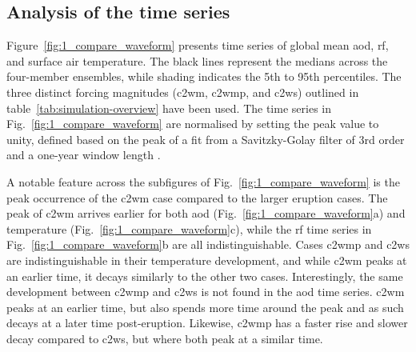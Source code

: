 \documentclass{ametsocV6.1}
\begin{document}

\subsection{Analysis of the time series}

Figure~\ref{fig:1_compare_waveform} presents time series of global mean \gls{aod},
\gls{rf}, and surface air temperature. The black lines represent the medians across the
four-member ensembles, while shading indicates the 5th to 95th percentiles. The three
distinct forcing magnitudes (\gls{c2wm}, \gls{c2wmp}, and \gls{c2ws}) outlined in
table~\ref{tab:simulation-overview} have been used. The time series in
Fig.~\ref{fig:1_compare_waveform} are normalised by setting the peak value to unity,
defined based on the peak of a fit from a Savitzky-Golay filter of 3rd order and a
one-year window length \citep{savitzky1964}.

A notable feature across the subfigures of Fig.~\ref{fig:1_compare_waveform} is the peak
occurrence of the \gls{c2wm} case compared to the larger eruption cases. The peak of
\gls{c2wm} arrives earlier for both \gls{aod} (Fig.~\ref{fig:1_compare_waveform}a) and
temperature (Fig.~\ref{fig:1_compare_waveform}c), while the \gls{rf} time series in
Fig.~\ref{fig:1_compare_waveform}b are all indistinguishable. Cases \gls{c2wmp} and
\gls{c2ws} are indistinguishable in their temperature development, and while \gls{c2wm}
peaks at an earlier time, it decays similarly to the other two cases. Interestingly, the
same development between \gls{c2wmp} and \gls{c2ws} is not found in the \gls{aod} time
series. \gls{c2wm} peaks at an earlier time, but also spends more time around the peak
and as such decays at a later time post-eruption. Likewise, \gls{c2wmp} has a faster
rise and slower decay compared to \gls{c2ws}, but where both peak at a similar time.
\end{document}

